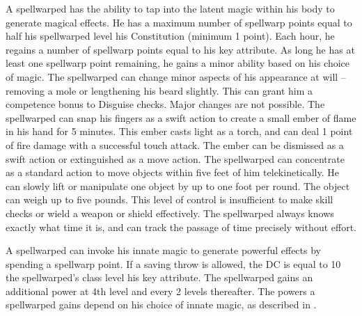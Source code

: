  A spellwarped has the ability to tap into the latent magic within his body to generate magical effects. He has a maximum number of spellwarp points equal to half his spellwarped level \add his Constitution (minimum 1 point). Each hour, he regains a number of spellwarp points equal to his key attribute. As long he has at least one spellwarp point remaining, he gains a minor ability based on his choice of magic.
 The spellwarped can change minor aspects of his appearance at will -- removing a mole or lengthening his beard slightly. This can grant him a  competence bonus to Disguise checks. Major changes are not possible.
 The spellwarped can snap his fingers as a swift action to create a small ember of flame in his hand for 5 minutes. This ember casts light as a torch, and can deal 1 point of fire damage with a successful touch attack. The ember can be dismissed as a swift action or extinguished as a move action.
 The spellwarped can concentrate as a standard action to move objects within five feet of him telekinetically. He can slowly lift or manipulate one object by up to one foot per round. The object can weigh up to five pounds. This level of control is insufficient to make skill checks or wield a weapon or shield effectively.
 The spellwarped always knows exactly what time it is, and can track the passage of time precisely without effort.

 A spellwarped can invoke his innate magic to generate powerful effects by spending a spellwarp point. If a saving throw is allowed, the DC is equal to 10 \add the spellwarped's class level \add his key attribute. The spellwarped gains an additional power at 4th level and every 2 levels thereafter. The powers a spellwarped gains depend on his choice of innate magic, as described in .

